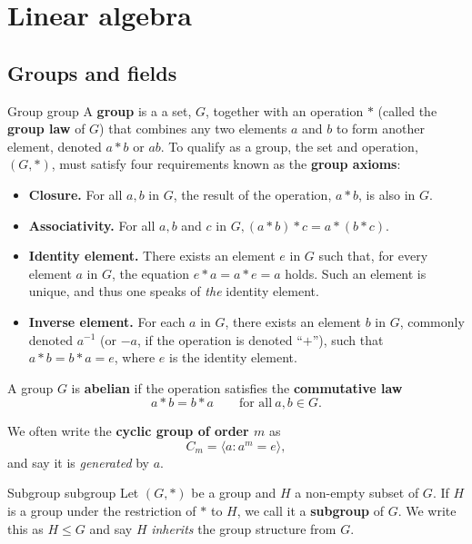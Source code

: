 \section{Linear algebra}
\subsection{Groups and fields}

\begin{definition}{Group \cite{math2601_notes}}{group}
A \textbf{group} is a a set, $G$, together with an operation $*$ (called the \textbf{group law} of $G$) that combines any two elements $a$ and $b$ to form another element, denoted $a * b$ or $ab$. To qualify as a group, the set and operation, $(G, *)$, must satisfy four requirements known as the \textbf{group axioms}:
\begin{itemize}
 	\item \textbf{Closure.} For all $a, b$ in $G$, the result of the operation, $a * b$, is also in $G$.
 	\item \textbf{Associativity.} For all $a, b$ and $c$ in $G, (a * b) * c = a * (b * c)$.
 	\item \textbf{Identity element.} There exists an element $e$ in $G$ such that, for every element $a$ in $G$, the equation $e * a = a * e = a$ holds. Such an element is unique, and thus one speaks of \textit{the} identity element.
 	\item \textbf{Inverse element.} For each $a$ in $G$, there exists an element $b$ in $G$, commonly denoted $a^{-1}$ (or $-a$, if the operation is denoted ``$+$''), such that $a * b = b * a = e$, where $e$ is the identity element.
\end{itemize}
\end{definition}

A group $G$ is \textbf{abelian} if the operation satisfies the \textbf{commutative law}
$$ a * b = b * a \qquad \text{for all} \ a, b \in G . $$

We often write the \textbf{cyclic group of order $m$} as
$$ C_m = \langle a : a^m = e \rangle , $$
and say it is \textit{generated} by $a$.


\begin{definition}{Subgroup \cite{math2601_notes}}{subgroup}
Let $(G, *)$ be a group and $H$ a non-empty subset of $G$. If $H$ is a group under the restriction of $*$ to $H$, we call it a \textbf{subgroup} of $G$. We write this as $H \leq G$ and say $H$ \textit{inherits} the group structure from $G$.
\end{definition}

